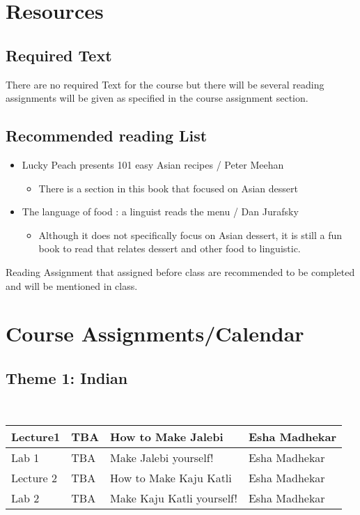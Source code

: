 \documentclass{article}
\begin{document}
\section{Resources}
\subsection{Required Text}
There are no required Text for the course but there will be several reading assignments will be given as specified in the course assignment section. 

\subsection{Recommended reading List}

\begin{itemize}
    \item Lucky Peach presents 101 easy Asian recipes / Peter Meehan 
    \begin{itemize}
        \item There is a section in this book that focused on Asian dessert
    \end{itemize}
    \item The language of food : a linguist reads the menu / Dan Jurafsky
    \begin{itemize}
        \item Although it does not specifically focus on Asian dessert, it is still a fun book to read that relates dessert and other food to linguistic. 
    \end{itemize}
\end{itemize}

Reading Assignment that assigned before class are recommended to be completed and will be mentioned in class.



\section{Course Assignments/Calendar}


\subsection*{Theme 1: Indian}\\
\vspace{0.5em} \begin{tabular}{|l|l|l|l|}
\hline 
 Lecture1 &  TBA & How to Make Jalebi & Esha Madhekar\\
\hline
 Lab 1 &  TBA & Make Jalebi yourself! & Esha Madhekar\\
\hline
Lecture 2 &  TBA & How to Make Kaju Katli & Esha Madhekar\\
\hline 
Lab 2 & TBA & Make Kaju Katli yourself! & Esha Madhekar\\
\hline
\end{tabular}
\end{document}
